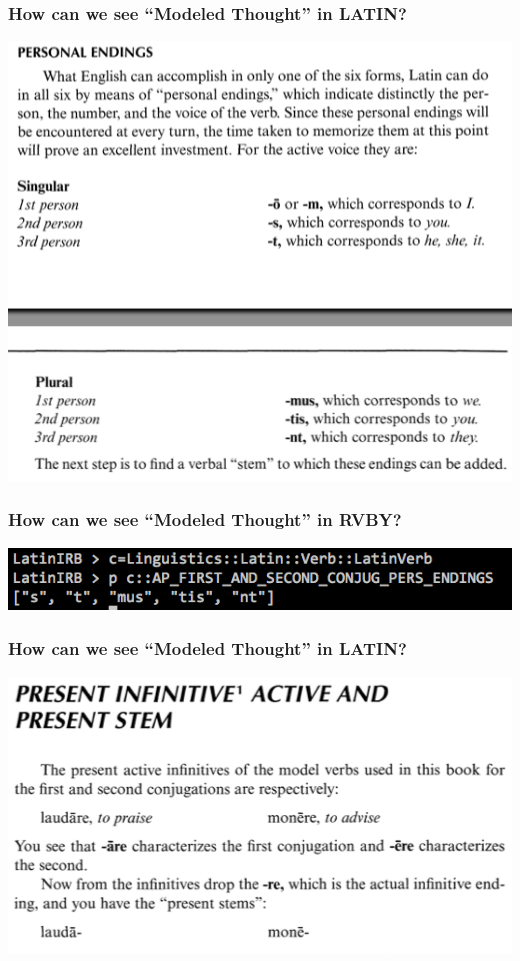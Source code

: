 \documentclass[slidestop,compress,mathserif,notes]{beamer}
\begin{document}
\begin{frame}
	\frametitle{How can we see ``Modeled Thought'' in \textsc{LATIN}?} 
	\includegraphics[scale=0.45]{img/conj_how_1.png}
\end{frame}

\begin{frame}
	\frametitle{How can we see ``Modeled Thought'' in \textsc{RVBY}?} 
	\includegraphics[scale=0.45]{img/conj_how_1b.png}
\end{frame}


\begin{frame}
	\frametitle{How can we see ``Modeled Thought'' in \textsc{LATIN}?} 
	\includegraphics[scale=0.45]{img/conj_how_2.png}
\end{frame}
\end{document}
